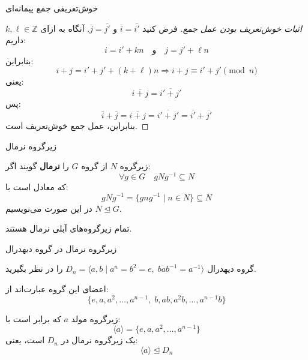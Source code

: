 \begin{frame}[t]{خوش‌تعریفی جمع پیمانه‌ای}
    \begin{proof}[اثبات خوش‌تعریف بودن عمل جمع]
        فرض کنید \( \overline{i} = \overline{i'} \) و \( \overline{j} = \overline{j'} \).
        آنگاه به ازای \( k, \ell \in \mathbb{Z} \) داریم:
        \[
            i = i' + kn \quad \text{و} \quad j = j' + \ell n
        \]
        بنابراین:
        \[
            i + j = i' + j' + (k + \ell)n \Rightarrow i + j \equiv i' + j' \pmod{n}
        \]
        یعنی:
        \[
            \overline{i + j} = \overline{i' + j'}
        \]
        پس:
        \[
            \overline{i} + \overline{j} = \overline{i + j} = \overline{i' + j'} = \overline{i'} + \overline{j'}
        \]
        بنابراین، عمل جمع خوش‌تعریف است.
    \end{proof}

\end{frame}

\begin{frame}[t]{زیرگروه نرمال}
    \begin{definition}
        زیرگروه \( N \) از گروه \( G \) را \textbf{نرمال} گویند اگر:
        \[
            \forall g \in G \quad gNg^{-1} \subseteq N
        \]
        که معادل است با:
        \[
            gNg^{-1} = \{ gng^{-1} \mid n \in N \} \subseteq N
        \]
        در این صورت می‌نویسیم \( N \trianglelefteq G \).

    \end{definition}
    \begin{example}
        تمام زیرگروه‌های آبلی نرمال هستند.
    \end{example}

\end{frame}

\begin{frame}[t]{زیرگروه نرمال در گروه دیهدرال}
    \begin{example}
        گروه دیهدرال \( D_n = \langle a, b \mid a^n = b^2 = e,\; bab^{-1} = a^{-1} \rangle \) را در نظر بگیرید.

        اعضای این گروه عبارت‌اند از:
        \[
            \{ e, a, a^2, \ldots, a^{n-1},\; b, ab, a^2b, \ldots, a^{n-1}b \}
        \]

        زیرگروه مولد \( a \) که برابر است با:
        \[
            \langle a \rangle = \{ e, a, a^2, \ldots, a^{n-1} \}
        \]
        یک زیرگروه نرمال در \( D_n \) است، یعنی:
        \[
            \langle a \rangle \trianglelefteq D_n
        \]
    \end{example}

    \end{frame}

